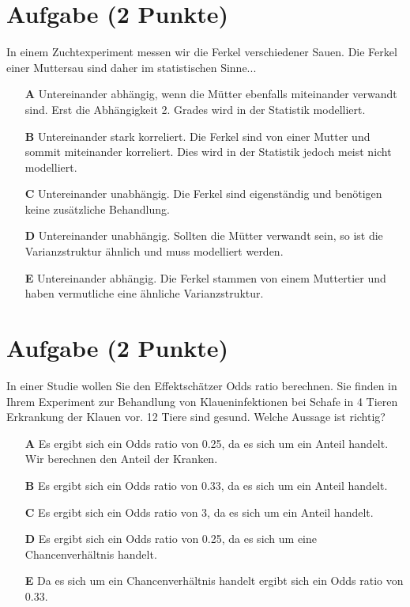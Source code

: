 \documentclass[a4paper, 9pt]{scrartcl}\usepackage[]{graphicx}\usepackage[]{xcolor}
\begin{document}
\section{Aufgabe \hfill (2 Punkte)}



In einem Zuchtexperiment messen wir die Ferkel verschiedener Sauen. Die Ferkel einer Muttersau sind daher im statistischen Sinne...



\begin{enumerate}
\item [\textbf{A} \msquare] Untereinander abhängig, wenn die Mütter ebenfalls miteinander verwandt sind. Erst die Abhängigkeit 2. Grades wird in der Statistik modelliert.
\item [\textbf{B} \msquare] Untereinander stark korreliert. Die Ferkel sind von einer Mutter und sommit miteinander korreliert. Dies wird in der Statistik jedoch meist nicht modelliert.
\item [\textbf{C} \msquare] Untereinander unabhängig. Die Ferkel sind eigenständig und benötigen keine zusätzliche Behandlung.
\item [\textbf{D} \msquare] Untereinander unabhängig. Sollten die Mütter verwandt sein, so ist die Varianzstruktur ähnlich und muss modelliert werden.
\item [\textbf{E} \msquare] Untereinander abhängig. Die Ferkel stammen von einem Muttertier und haben vermutliche eine ähnliche Varianzstruktur.
\end{enumerate}

\section{Aufgabe \hfill (2 Punkte)}



In einer Studie wollen Sie den Effektschätzer Odds ratio berechnen. Sie finden in Ihrem Experiment zur Behandlung von Klaueninfektionen bei Schafe in 4 Tieren Erkrankung der Klauen vor. 12 Tiere sind gesund. Welche Aussage ist richtig?



\begin{enumerate}
\item [\textbf{A} \msquare] Es ergibt sich ein Odds ratio von 0.25, da es sich um ein Anteil handelt. Wir berechnen den Anteil der Kranken.
\item [\textbf{B} \msquare] Es ergibt sich ein Odds ratio von 0.33, da es sich um ein Anteil handelt.
\item [\textbf{C} \msquare] Es ergibt sich ein Odds ratio von 3, da es sich um ein Anteil handelt.
\item [\textbf{D} \msquare] Es ergibt sich ein Odds ratio von 0.25, da es sich um eine Chancenverhältnis handelt.
\item [\textbf{E} \msquare] Da es sich um ein Chancenverhältnis handelt ergibt sich ein Odds ratio von 0.33.
\end{enumerate}
\end{document}
